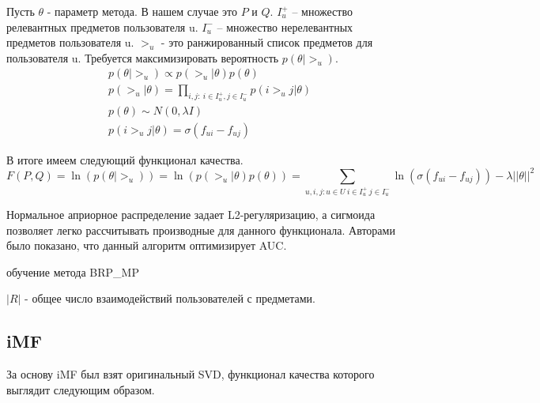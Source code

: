 \documentclass[14pt]{extarticle}
\begin{document}
Пусть $\theta$ - параметр метода. В нашем случае это $P$ и $Q$.  $I_u^+$ -- множество релевантных предметов пользователя u. $I_u^-$ -- множество нерелевантных предметов пользователя u.  $>_u$ - это ранжированный список предметов для пользователя u. Требуется максимизировать вероятность $p(\theta|>_u)$.
\begin{equation*}
\begin{split}
	& p(\theta| >_u) \propto p(>_u| \theta)p(\theta) \\
	& p(>_u| \theta) = \prod_{i, j: \ i \in I_u^+, j \in I_u^-}p(i >_u j| \theta)\\
	& p(\theta) \sim N(0, \lambda I) \\
	& p(i >_u j| \theta) = \sigma(f_{ui} - f_{uj}) 
\end{split}
\end{equation*}

В итоге имеем следующий функционал качества. 
\begin{equation*}
F(P, Q) = \ln(p(\theta| >_u)) = \ln(p(>_u|\theta)p(\theta)) = \sum_{u,i,j: u \in U\ i \in I_u^+\ j \in I_u^-}\ln(\sigma(f_{ui} - f_{uj})) - \lambda {||\theta||} ^ 2
\end{equation*}


Нормальное априорное распределение задает L2-регуляризацию, а сигмоида позволяет легко рассчитывать производные для данного функционала. Авторами  было показано, что данный алгоритм оптимизирует AUC.

\begin{algorithm}[h]
\caption{обучение метода BRP\_MP}
\begin{algorithmic}[1]
\State $|R|$ - общее число взаимодействий пользователей с предметами.
\Repeat {} 

\end{algorithmic}
\label{alg:climf}
\end{algorithm}

\newpage
\subsection{iMF}
За основу iMF был взят оригинальный SVD, функционал качества которого выглядит следующим образом.
\end{document}
